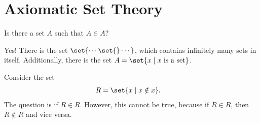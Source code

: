 \documentclass[10pt]{mypackage}
\begin{document}
\section{Axiomatic Set Theory}%
\begin{question}
  Is there a set $A$ such that $A\in A$?
\end{question}
\begin{answer}
  Yes! There is the set $\set{\cdots\set{}\cdots}$, which contains infinitely many sets in itself. Additionally, there is the set $A = \set{x\mid x\text{ is a set}}$.
\end{answer}
\begin{example}
Consider the set
\begin{align*}
  R &= \set{x\mid x\notin x}.
\end{align*}
The question is if $R\in R$. However, this cannot be true, because if $R\in R$, then $R\notin R$ and vice versa.
\end{example}
\end{document}
